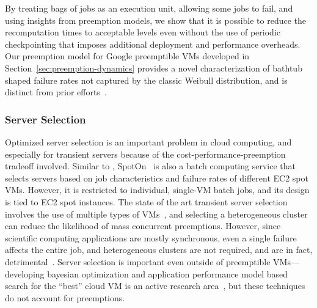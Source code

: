 By treating bags of jobs as an execution unit, allowing some jobs to fail, and using insights from preemption models, we show that it is possible to reduce the recomputation times to acceptable levels even without the  use of periodic  checkpointing that imposes additional deployment and performance overheads. 
Our preemption model for Google preemptible VMs developed in Section~\ref{sec:preemption-dynamics} provides a novel characterization of bathtub shaped failure rates not captured by the classic Weibull distribution, and is distinct from prior efforts~\cite{mudholkar1993exponentiated, crevecoeur1993model}. 


\vspace*{\subsecspace}
\subsubsection{Server Selection}

Optimized server selection is an important problem in cloud computing, and especially for transient servers because of the cost-performance-preemption tradeoff involved. 
Similar to \sysname, SpotOn~\cite{spoton} is also a batch computing service that selects servers based on job characteristics and failure rates of different EC2 spot VMs. However, it is restricted to individual, single-VM batch jobs, and its design is tied to EC2 spot instances.
The state of the art transient server selection involves the use of multiple types of VMs~\cite{exosphere}, and selecting a heterogeneous cluster can reduce the likelihood of mass concurrent preemptions.
However, since scientific computing applications are mostly synchronous, even a single failure affects the entire job, and heterogeneous clusters are not required, and are in fact, detrimental~\cite{exosphere}. 
Server selection is important even outside of preemptible VMs---developing bayesian optimization and application performance model based search for the ``best'' cloud VM is an active research area~\cite{alipourfard_cherrypick, yadwadkar_selecting_2017}, but these techniques do not  account for preemptions. 

